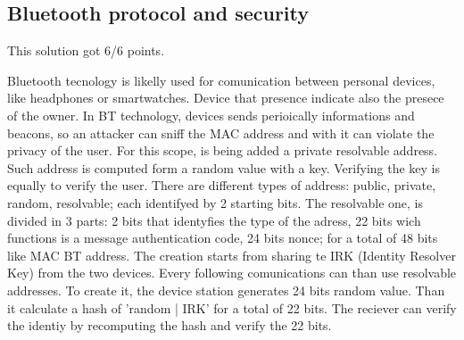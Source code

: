 \subsection{Bluetooth protocol and security}


\begin{solution}
    This solution got 6/6 points.
    
    Bluetooth tecnology is likelly used for comunication between personal devices, like headphones or smartwatches. Device that presence indicate also the presece of the owner. In BT technology, devices sends perioically informations and beacons, so an attacker can sniff the MAC address and with it can violate the privacy of the user. For this scope, is being added a private resolvable address. Such address is computed form a random value with a key. Verifying the key is equally to verify the user.
    There are different types of address: public, private, random, resolvable; each identifyed by 2 starting bits. The resolvable one, is divided in 3 parts: 2 bits that identyfies the type of the adress, 22 bits wich functions is a message authentication code, 24 bits nonce; for a total of 48 bits like MAC BT address.
    The creation starts from sharing te IRK (Identity Resolver Key) from the two devices. Every following comunications can than use resolvable addresses. To create it, the device station generates 24 bits random value. Than it calculate a hash of 'random | IRK' for a total of 22 bits. The reciever can verify the identiy by recomputing the hash and verify the 22 bits.
\end{solution}





